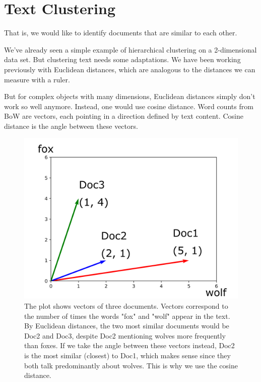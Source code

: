 \chapter{Text Clustering}

 That is, we would like to identify documents that are similar to each other.

We've already seen a simple example of hierarchical clustering on a 2-dimensional data set. But clustering text needs some adaptations. We have been working previously with Euclidean distances, which are analogous to the distances we can measure with a ruler.

But for complex objects with many dimensions, Euclidean distances simply don't work so well anymore. Instead, one would use cosine distance. Word counts from BoW are vectors, each pointing in a direction defined by text content. Cosine distance is the angle between these vectors.

\vspace{-0.2cm}
\begin{figure}[h]
  \centering
  \includegraphics[width=0.9\linewidth]{cosine-distance-eng.png}%
  \caption{The plot shows vectors of three documents. Vectors correspond to the number of times the words "fox" and "wolf" appear in the text. By Euclidean distances, the two most similar documents would be Doc2 and Doc3, despite Doc2 mentioning wolves more frequently than foxes. If we take the angle between these vectors instead, Doc2 is the most similar (closest) to Doc1, which makes sense since they both talk predominantly about wolves. This is why we use the cosine distance.}
\end{figure}
\vspace{-0.3cm}

